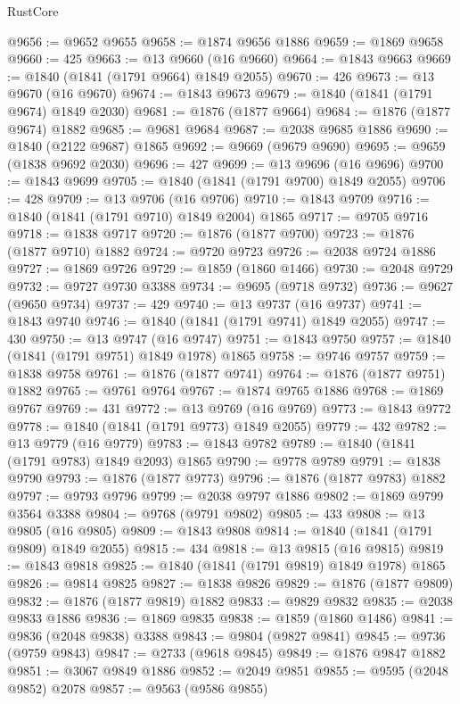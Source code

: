 \begin{lexlean}{RustCore}
\begin{coremodule}
@9656 := @9652 @9655
@9658 := @1874 @9656 @1886
@9659 := @1869 @9658
@9660 := 425
@9663 := @13 @9660 (@16 @9660)
@9664 := @1843 @9663
@9669 := @1840 (@1841 (@1791 @9664) @1849 @2055)
@9670 := 426
@9673 := @13 @9670 (@16 @9670)
@9674 := @1843 @9673
@9679 := @1840 (@1841 (@1791 @9674) @1849 @2030)
@9681 := @1876 (@1877 @9664)
@9684 := @1876 (@1877 @9674) @1882
@9685 := @9681 @9684
@9687 := @2038 @9685 @1886
@9690 := @1840 (@2122 @9687) @1865
@9692 := @9669 (@9679 @9690)
@9695 := @9659 (@1838 @9692 @2030)
@9696 := 427
@9699 := @13 @9696 (@16 @9696)
@9700 := @1843 @9699
@9705 := @1840 (@1841 (@1791 @9700) @1849 @2055)
@9706 := 428
@9709 := @13 @9706 (@16 @9706)
@9710 := @1843 @9709
@9716 := @1840 (@1841 (@1791 @9710) @1849 @2004) @1865
@9717 := @9705 @9716
@9718 := @1838 @9717
@9720 := @1876 (@1877 @9700)
@9723 := @1876 (@1877 @9710) @1882
@9724 := @9720 @9723
@9726 := @2038 @9724 @1886
@9727 := @1869 @9726
@9729 := @1859 (@1860 @1466)
@9730 := @2048 @9729
@9732 := @9727 @9730 @3388
@9734 := @9695 (@9718 @9732)
@9736 := @9627 (@9650 @9734)
@9737 := 429
@9740 := @13 @9737 (@16 @9737)
@9741 := @1843 @9740
@9746 := @1840 (@1841 (@1791 @9741) @1849 @2055)
@9747 := 430
@9750 := @13 @9747 (@16 @9747)
@9751 := @1843 @9750
@9757 := @1840 (@1841 (@1791 @9751) @1849 @1978) @1865
@9758 := @9746 @9757
@9759 := @1838 @9758
@9761 := @1876 (@1877 @9741)
@9764 := @1876 (@1877 @9751) @1882
@9765 := @9761 @9764
@9767 := @1874 @9765 @1886
@9768 := @1869 @9767
@9769 := 431
@9772 := @13 @9769 (@16 @9769)
@9773 := @1843 @9772
@9778 := @1840 (@1841 (@1791 @9773) @1849 @2055)
@9779 := 432
@9782 := @13 @9779 (@16 @9779)
@9783 := @1843 @9782
@9789 := @1840 (@1841 (@1791 @9783) @1849 @2093) @1865
@9790 := @9778 @9789
@9791 := @1838 @9790
@9793 := @1876 (@1877 @9773)
@9796 := @1876 (@1877 @9783) @1882
@9797 := @9793 @9796
@9799 := @2038 @9797 @1886
@9802 := @1869 @9799 @3564 @3388
@9804 := @9768 (@9791 @9802)
@9805 := 433
@9808 := @13 @9805 (@16 @9805)
@9809 := @1843 @9808
@9814 := @1840 (@1841 (@1791 @9809) @1849 @2055)
@9815 := 434
@9818 := @13 @9815 (@16 @9815)
@9819 := @1843 @9818
@9825 := @1840 (@1841 (@1791 @9819) @1849 @1978) @1865
@9826 := @9814 @9825
@9827 := @1838 @9826
@9829 := @1876 (@1877 @9809)
@9832 := @1876 (@1877 @9819) @1882
@9833 := @9829 @9832
@9835 := @2038 @9833 @1886
@9836 := @1869 @9835
@9838 := @1859 (@1860 @1486)
@9841 := @9836 (@2048 @9838) @3388
@9843 := @9804 (@9827 @9841)
@9845 := @9736 (@9759 @9843)
@9847 := @2733 (@9618 @9845)
@9849 := @1876 @9847 @1882
@9851 := @3067 @9849 @1886
@9852 := @2049 @9851
@9855 := @9595 (@2048 @9852) @2078
@9857 := @9563 (@9586 @9855)

\end{coremodule}
\end{lexlean}
